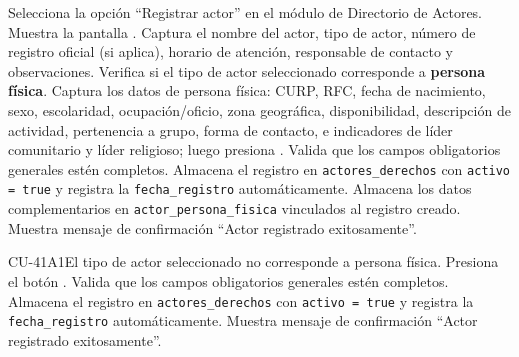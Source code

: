 \begin{UCtrayectoria}
	\UCpaso[\UCactor] Selecciona la opción ``Registrar actor'' en el módulo de Directorio de Actores.
	\UCpaso Muestra la pantalla .
	\UCpaso[\UCactor] \label{CU-41.ingresaDatos} Captura el nombre del actor, tipo de actor, número de registro oficial (si aplica), horario de atención, responsable de contacto y observaciones.
	\UCpaso Verifica si el tipo de actor seleccionado corresponde a \textbf{persona física}. 
	\UCpaso[\UCactor] \label{CU-41.ingresaDatosPF} Captura los datos de persona física: CURP, RFC, fecha de nacimiento, sexo, escolaridad, ocupación/oficio, zona geográfica, disponibilidad, descripción de actividad, pertenencia a grupo, forma de contacto, e indicadores de líder comunitario y líder religioso; luego presiona .
	\UCpaso Valida que los campos obligatorios generales estén completos.     
	\UCpaso Almacena el registro en \texttt{actores\_derechos} con \texttt{activo = true} y registra la \texttt{fecha\_registro} automáticamente.
	\UCpaso Almacena los datos complementarios en \texttt{actor\_persona\_fisica} vinculados al registro creado.
	\UCpaso Muestra mensaje de confirmación ``Actor registrado exitosamente''.
\end{UCtrayectoria}

\begin{UCtrayectoriaA}{CU-41}{A1}{El tipo de actor seleccionado no corresponde a persona física.}
	\UCpaso[\UCactor] Presiona el botón .
	\UCpaso Valida que los campos obligatorios generales estén completos. 
	\UCpaso Almacena el registro en \texttt{actores\_derechos} con \texttt{activo = true} y registra la \texttt{fecha\_registro} automáticamente.
	\UCpaso Muestra mensaje de confirmación ``Actor registrado exitosamente''.
\end{UCtrayectoriaA}


